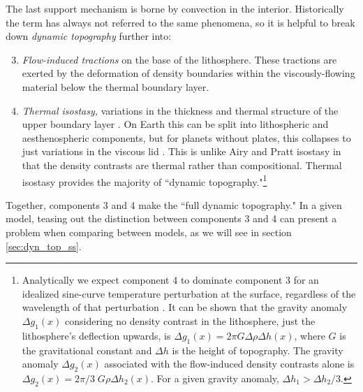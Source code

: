 The last support mechanism is borne by convection in the interior. Historically the term has always not referred to the same phenomena, so it is helpful to break down \emph{dynamic topography} further \citep{Orth2011, Molnar2015} into:
\begin{enumerate}
\setcounter{enumi}{2}
\item \emph{Flow-induced tractions} on the base of the lithosphere. These tractions are exerted by the deformation of density boundaries within the viscously-flowing material below the thermal boundary layer.
\item \emph{Thermal isostasy,} variations in the thickness and thermal structure of the upper boundary layer \citep{Fowler1985}. On Earth this can be split into lithospheric and aesthenospheric components, but for planets without plates, this collapses to just variations in the viscous lid \citep[see][]{Orth2011}. This is unlike Airy and Pratt isostasy in that the density contrasts are thermal rather than compositional. Thermal isostasy provides the majority of ``dynamic topography."\footnote{Analytically we expect component 4 to dominate component 3 for an idealized sine-curve temperature perturbation at the surface, regardless of the wavelength of that perturbation \citep{McKenzie1977}. It can be shown that the gravity anomaly $\Delta g_1(x)$ considering no density contrast in the lithosphere, just the lithosphere's deflection upwards, is $\Delta g_1(x) = 2\pi G \Delta \rho \Delta h(x)$, where $G$ is the gravitational constant and $\Delta h$ is the height of topography. The gravity anomaly $\Delta g_2(x)$ associated with the flow-induced density contrasts alone is $\Delta g_2(x) = 2\pi/3 \; G\rho\Delta h_2(x)$. For a given gravity anomaly, $\Delta h_1 > \Delta h_2/3$.}
\end{enumerate}
Together, components 3 and 4 make the ``full dynamic topography." In a given model, teasing out the distinction between components 3 and 4 can present a problem when comparing between models, as we will see in section \ref{sec:dyn_top_ss}. 





